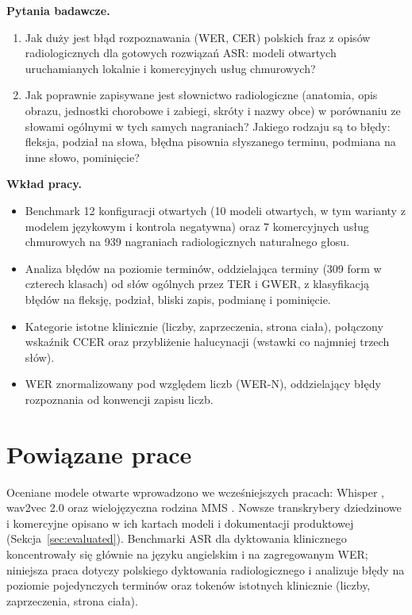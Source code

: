 \documentclass[conference]{IEEEtran}
\begin{document}
\noindent\textbf{Pytania badawcze.}
\begin{enumerate}
\item Jak duży jest błąd rozpoznawania (WER, CER) polskich fraz z opisów radiologicznych dla gotowych rozwiązań ASR: modeli otwartych uruchamianych lokalnie i komercyjnych usług chmurowych?
\item Jak poprawnie zapisywane jest słownictwo radiologiczne (anatomia, opis obrazu, jednostki chorobowe i zabiegi, skróty i nazwy obce) w porównaniu ze słowami ogólnymi w tych samych nagraniach? Jakiego rodzaju są to błędy: fleksja, podział na słowa, błędna pisownia słyszanego terminu, podmiana na inne słowo, pominięcie?
\end{enumerate}

\noindent\textbf{Wkład pracy.}
\begin{itemize}
\item Benchmark 12 konfiguracji otwartych (10 modeli otwartych, w tym warianty z modelem językowym i kontrola negatywna) oraz 7 komercyjnych usług chmurowych na 939 nagraniach radiologicznych naturalnego głosu.
\item Analiza błędów na poziomie terminów, oddzielająca terminy (309 form w czterech klasach) od słów ogólnych przez TER i GWER, z klasyfikacją błędów na fleksję, podział, bliski zapis, podmianę i pominięcie.
\item Kategorie istotne klinicznie (liczby, zaprzeczenia, strona ciała), połączony wskaźnik CCER oraz przybliżenie halucynacji (wstawki co najmniej trzech słów).
\item WER znormalizowany pod względem liczb (WER-N), oddzielający błędy rozpoznania od konwencji zapisu liczb.
\end{itemize}

\section{Powiązane prace}
Oceniane modele otwarte wprowadzono we wcześniejszych pracach: Whisper \cite{r2}, wav2vec 2.0 \cite{r3} oraz wielojęzyczna rodzina MMS \cite{r4}. Nowsze transkrybery dziedzinowe i komercyjne opisano w ich kartach modeli i dokumentacji produktowej (Sekcja~\ref{sec:evaluated}). Benchmarki ASR dla dyktowania klinicznego koncentrowały się głównie na języku angielskim i na zagregowanym WER; niniejsza praca dotyczy polskiego dyktowania radiologicznego i analizuje błędy na poziomie pojedynczych terminów oraz tokenów istotnych klinicznie (liczby, zaprzeczenia, strona ciała).
\end{document}
